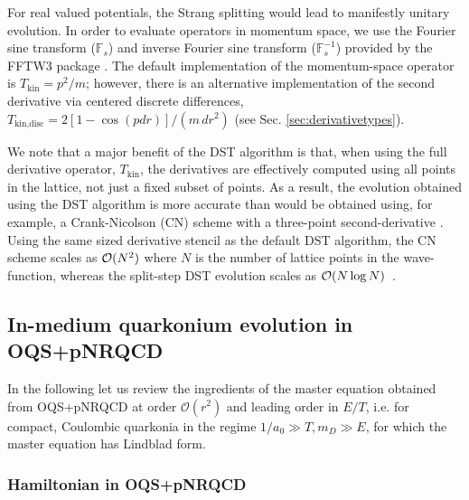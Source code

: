 \documentclass[times,sort&compress,final]{elsarticle}
\begin{document}
For real valued potentials, the Strang splitting would lead to manifestly unitary evolution.
In order to evaluate operators in momentum space, we use the Fourier sine 
transform ($\mathbb{F}_s$) and inverse Fourier sine transform 
($\mathbb{F}_s^{-1}$) provided by the FFTW3 package \cite{FFTW}.
The default implementation of the momentum-space operator is $T_\text{kin} = p^2/m$; however, 
there is an alternative implementation of the second derivative via centered discrete 
differences, $T_\text{kin,disc} = 2[1-\cos(p dr)]/(m \, dr^2)$ (see Sec. \ref{sec:derivativetypes}).  

We note that a major benefit of the DST algorithm is that, when using the full derivative operator, $T_\text{kin}$, the derivatives are effectively computed using all 
points in the lattice, not just a fixed subset of points. 
As a result, the evolution obtained using the DST algorithm is more accurate than would be obtained using, for example, a Crank-Nicolson (CN) scheme with a three-point second-derivative \cite{Boyd:2019arx}.  
Using the same sized derivative stencil as the default DST algorithm, the CN scheme scales as ${\cal O}(N^2)$ where $N$ is the number of lattice points in the wave-function, whereas the split-step DST evolution scales as ${\cal O}(N \log N)$~\cite{Boyd:2019arx}.

\subsection{In-medium quarkonium evolution in OQS+pNRQCD}
\label{ssec:OQSpNRQCD}

In the following let us review the ingredients of the master equation obtained from OQS+pNRQCD 
\cite{Brambilla:2016wgg,Brambilla:2017zei} at order $\mathcal{O}(r^2)$ and leading order in $E/T$, i.e. for compact, Coulombic quarkonia in the regime $1/a_0 \gg T,m_D\gg E$, for which the master 
equation has Lindblad form.

\subsubsection{Hamiltonian in OQS+pNRQCD }
\end{document}
